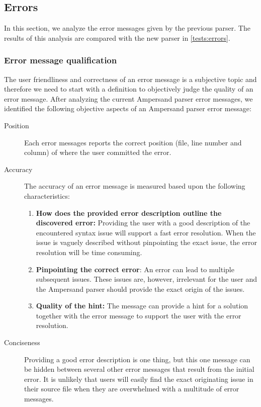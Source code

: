 
\subsection{Errors}
\label{analysis:errors}
In this section, we analyze the error messages given by the previous parser.
The results of this analysis are compared with the new parser in \autoref{tests:errors}.

\subsubsection{Error message qualification}
The user friendliness and correctness of an error message is a subjective topic and therefore we need to start with a definition to objectively judge the quality of an error message.
After analyzing the current Ampersand parser error messages, we identified the following objective aspects of an Ampersand parser error message:
%
\begin{description}
	\item [Position]
	Each error messages reports the correct position (file, line number and column) of where the user committed the error.
	\item [Accuracy]
	The accuracy of an error message is measured based upon the following characteristics:
	\begin{enumerate}
		\item	\textbf{\small How does the provided error description outline the discovered error:}
				Providing the user with a good description of the encountered syntax issue will support a fast error resolution.
				When the issue is vaguely described without pinpointing the exact issue, the error resolution will be time consuming.
		\item	\textbf{\small Pinpointing the correct error}:
				An error can lead to multiple subsequent issues.
				These issues are, however, irrelevant for the user and the Ampersand parser should provide the exact origin of the issues.
		\item	\textbf{\small Quality of the hint:}
			The message can provide a hint for a solution together with the error message to support the user with the error resolution.
	\end {enumerate}
    \item[Conciseness]
	Providing a good error description is one thing, but this one message can be hidden between several other error messages that result from the initial error.
	It is unlikely that users will easily find the exact originating issue in their source file when they are overwhelmed with a multitude of error messages. %
\end {description}
